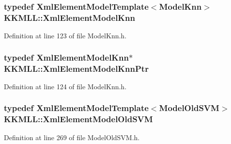 \subsubsection[{\texorpdfstring{Xml\+Element\+Model\+Knn}{XmlElementModelKnn}}]{\setlength{\rightskip}{0pt plus 5cm}typedef {\bf Xml\+Element\+Model\+Template}$<${\bf Model\+Knn}$>$ {\bf K\+K\+M\+L\+L\+::\+Xml\+Element\+Model\+Knn}}\hypertarget{namespace_k_k_m_l_l_a7e71fb99af9b98b3c563cfe7e4b07d13}{}\label{namespace_k_k_m_l_l_a7e71fb99af9b98b3c563cfe7e4b07d13}


Definition at line 123 of file Model\+Knn.\+h.

\subsubsection[{\texorpdfstring{Xml\+Element\+Model\+Knn\+Ptr}{XmlElementModelKnnPtr}}]{\setlength{\rightskip}{0pt plus 5cm}typedef {\bf Xml\+Element\+Model\+Knn}$\ast$ {\bf K\+K\+M\+L\+L\+::\+Xml\+Element\+Model\+Knn\+Ptr}}\hypertarget{namespace_k_k_m_l_l_af358d79ee647829bca0651ce6e0b502c}{}\label{namespace_k_k_m_l_l_af358d79ee647829bca0651ce6e0b502c}


Definition at line 124 of file Model\+Knn.\+h.

\subsubsection[{\texorpdfstring{Xml\+Element\+Model\+Old\+S\+VM}{XmlElementModelOldSVM}}]{\setlength{\rightskip}{0pt plus 5cm}typedef {\bf Xml\+Element\+Model\+Template}$<${\bf Model\+Old\+S\+VM}$>$ {\bf K\+K\+M\+L\+L\+::\+Xml\+Element\+Model\+Old\+S\+VM}}\hypertarget{namespace_k_k_m_l_l_a7e90a26f4dcf446a8c305201aa2b4432}{}\label{namespace_k_k_m_l_l_a7e90a26f4dcf446a8c305201aa2b4432}


Definition at line 269 of file Model\+Old\+S\+V\+M.\+h.

